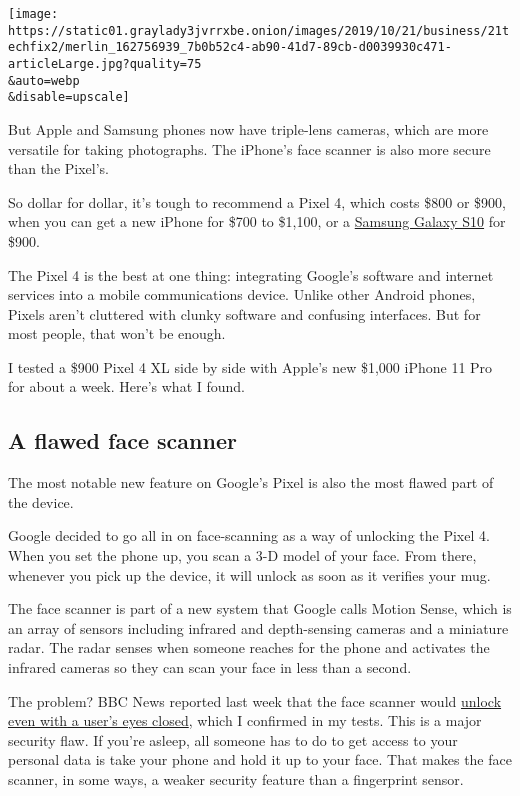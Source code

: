 \texttt{[image: https://static01.graylady3jvrrxbe.onion/images/2019/10/21/business/21techfix2/merlin\_162756939\_7b0b52c4-ab90-41d7-89cb-d0039930c471-articleLarge.jpg?quality=75\\\&auto=webp\\\&disable=upscale]}

But Apple and Samsung phones now have triple-lens cameras, which are
more versatile for taking photographs. The iPhone's face scanner is also
more secure than the Pixel's.

So dollar for dollar, it's tough to recommend a Pixel 4, which costs
\$800 or \$900, when you can get a new iPhone for \$700 to \$1,100, or a
\href{https://www.nytimes3xbfgragh.onion/2019/02/27/technology/personaltech/samsung-galaxy-s10-review.html}{Samsung
Galaxy S10} for \$900.

The Pixel 4 is the best at one thing: integrating Google's software and
internet services into a mobile communications device. Unlike other
Android phones, Pixels aren't cluttered with clunky software and
confusing interfaces. But for most people, that won't be enough.

I tested a \$900 Pixel 4 XL side by side with Apple's new \$1,000 iPhone
11 Pro for about a week. Here's what I found.

\hypertarget{a-flawed-face-scanner}{%
\subsection{A flawed face scanner}\label{a-flawed-face-scanner}}

The most notable new feature on Google's Pixel is also the most flawed
part of the device.

Google decided to go all in on face-scanning as a way of unlocking the
Pixel 4. When you set the phone up, you scan a 3-D model of your face.
From there, whenever you pick up the device, it will unlock as soon as
it verifies your mug.

The face scanner is part of a new system that Google calls Motion Sense,
which is an array of sensors including infrared and depth-sensing
cameras and a miniature radar. The radar senses when someone reaches for
the phone and activates the infrared cameras so they can scan your face
in less than a second.

The problem? BBC News reported last week that the face scanner would
\href{https://www.bbc.com/news/technology-50085630}{unlock even with a
user's eyes closed}, which I confirmed in my tests. This is a major
security flaw. If you're asleep, all someone has to do to get access to
your personal data is take your phone and hold it up to your face. That
makes the face scanner, in some ways, a weaker security feature than a
fingerprint sensor.


